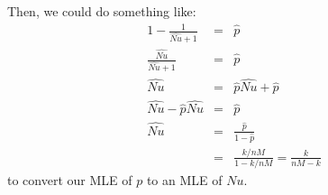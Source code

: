 \documentclass[11pt]{article}
\begin{document}
Then, we could do something like:
\begin{eqnarray*}
1 - \frac{1}{\widehat{Nu} + 1} & = & \hat{p}\\
\frac{\widehat{Nu}}{\widehat{Nu} + 1} & = & \hat{p}\\
\widehat{Nu} & = & \hat{p}\widehat{Nu} + \hat{p}\\
\widehat{Nu} - \hat{p}\widehat{Nu} & = & \hat{p}\\
\widehat{Nu} & = & \frac{\hat{p}}{1 - \hat{p}} \\
& = & \frac{k/nM}{1 - k/nM} = \frac{k}{nM-k}
\end{eqnarray*}
to convert our MLE of $p$ to an MLE of $Nu$.
\end{document}

